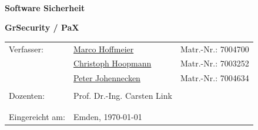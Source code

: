 \documentclass[
	fontsize=12pt, 
	paper=A4, 
	parskip=half, 
	DIV=calc, 
	headinclude=true, 
	footinclude=true, 
	open=right, 
	appendixprefix=true, 
	bibliography=totoc, 
	draft=false, 
	BCOR=0mm, 
	oneside ]{scrartcl}
\makeatletter
\newcommand{\firstauthor}{Marco Hoffmeier}
\newcommand{\firstid}{7004700}
\newcommand{\firstemail}{marco.hoffmeier@technik-emden.de}
\newcommand{\secondauthor}{Christoph Hoopmann}
\newcommand{\secondid}{7003252}
\newcommand{\secondemail}{christophhoopmann@gmail.com}
\newcommand{\thirdauthor}{Peter Johennecken}
\newcommand{\thirdid}{7004634}
\newcommand{\thirdemail}{peter.johennecken@technik-emden.de}
\newcommand{\mysupervisor}{Prof. Dr.-Ing. Carsten Link}
\newcommand{\myevaluator}{}
\newcommand{\mytitle}{Software Sicherheit}
\newcommand{\myworktitle}{GrSecurity / PaX}
\newcommand{\mystudy}{Informatik}
\newcommand{\myuniversity}{Hochschule Emden - Leer}
\newcommand{\myinstitute}{Technik}
\newcommand{\myhometown}{Emden}
\newcommand{\mysubmissiondate}{\today}
\newcommand{\mysubmissiontown}{\myhometown}
\makeatother
\begin{document}
\begin{titlepage}

\large  %

%

\begin{center}
~
\vfill\vfill\vfill
\vfill\vfill\vfill
\vfill\vfill\vfill
\vfill\vfill\vfill

{\huge\bfseries\mytitle}

\vfill

{\Large\bfseries\myworktitle}


\vfill\vfill\vfill
\vfill\vfill\vfill

\end{center}

\begin{tabular}{lll} 
Verfasser: 		& \href{mailto:\firstemail}{\firstauthor}  & Matr.-Nr.: \firstid \\
				& \href{mailto:\secondemail}{\secondauthor}  & Matr.-Nr.: \secondid \\
				& \href{mailto:\thirdemail}{\thirdauthor}  & Matr.-Nr.: \thirdid \\
				\\
Dozenten:		& \mysupervisor\\
				& \myevaluator \\
				\\
Eingereicht am: & \mysubmissiontown , \mysubmissiondate
\end{tabular}

\end{titlepage}

\cleardoublepage
\tableofcontents
\pagebreak


\end{document}
